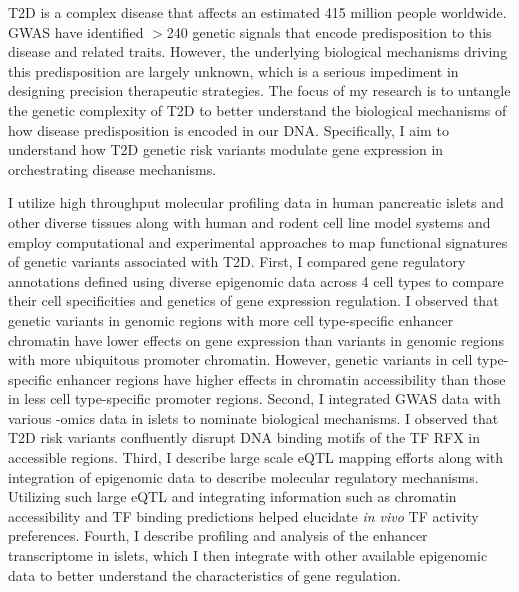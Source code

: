 \ac{T2D} is a complex disease that affects an estimated 415 million people worldwide. \ac{GWAS} have identified $>$240 genetic signals that encode predisposition to this disease and related traits. However, the underlying biological mechanisms driving this predisposition are largely unknown, which is a serious impediment in designing precision therapeutic strategies. The focus of my research is to untangle the genetic complexity of \ac{T2D} to better understand the biological mechanisms of how disease predisposition is encoded in our DNA. Specifically, I aim to understand how \ac{T2D} genetic risk variants modulate gene expression in orchestrating disease mechanisms. 


I utilize high throughput molecular profiling data in human pancreatic islets and other diverse tissues along with human and rodent cell line model systems and employ computational and experimental approaches to map functional signatures of genetic variants associated with T2D. First, I compared gene regulatory annotations defined using diverse epigenomic data across 4 cell types to compare their cell specificities and genetics of gene expression regulation. I observed that genetic variants in genomic regions with more cell type-specific enhancer chromatin have lower effects on gene expression than variants in genomic regions with more ubiquitous promoter chromatin. However, genetic variants in cell type-specific enhancer regions have higher effects in chromatin accessibility than those in less cell type-specific promoter regions. Second, I integrated GWAS data with various -omics data in islets to nominate biological mechanisms. I observed that T2D risk variants confluently disrupt DNA binding motifs of the \ac{TF} \ac{RFX} in accessible regions. Third, I describe large scale \ac{eQTL} mapping efforts along with integration of epigenomic data to describe molecular regulatory mechanisms. Utilizing such large eQTL and integrating information such as chromatin accessibility and TF binding predictions helped elucidate \textit{in vivo} TF activity preferences. Fourth, I describe profiling and analysis of the enhancer transcriptome in islets, which I then integrate with other available epigenomic data to better understand the characteristics of gene regulation. 
